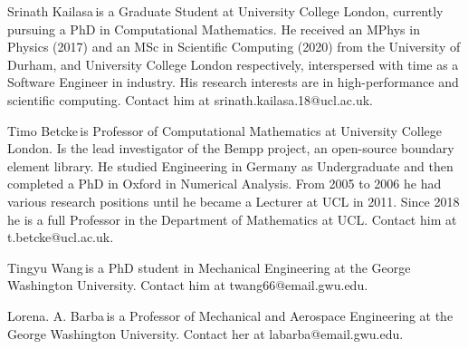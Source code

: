 \documentclass{IEEEcsmag}
\begin{document}



\begin{IEEEbiography}{Srinath Kailasa}{\,}is a Graduate Student at University College London, currently pursuing a PhD in Computational Mathematics. He received an MPhys in Physics (2017) and an MSc in Scientific Computing (2020) from the University of Durham, and University College London respectively, interspersed with time as a Software Engineer in industry. His research interests are in high-performance and scientific computing. Contact him at srinath.kailasa.18@ucl.ac.uk.
\end{IEEEbiography}

\begin{IEEEbiography}{Timo Betcke}{\,}is Professor of Computational Mathematics at University College London. Is the lead investigator of the Bempp project, an open-source boundary element library. He studied Engineering in Germany as Undergraduate and then completed a PhD in Oxford in Numerical Analysis. From 2005 to 2006 he had various research positions until he became a Lecturer at UCL in 2011. Since 2018 he is a full Professor in the Department of Mathematics at UCL. Contact him at t.betcke@ucl.ac.uk.
\end{IEEEbiography}

\begin{IEEEbiography}{Tingyu Wang}{\,}is a PhD student in Mechanical Engineering at the George Washington University. Contact him at twang66@email.gwu.edu.
\end{IEEEbiography}

\begin{IEEEbiography}{Lorena. A. Barba}{\,}is a Professor of Mechanical and Aerospace Engineering at the George Washington University.  Contact her at labarba@email.gwu.edu.
\end{IEEEbiography}
\end{document}
